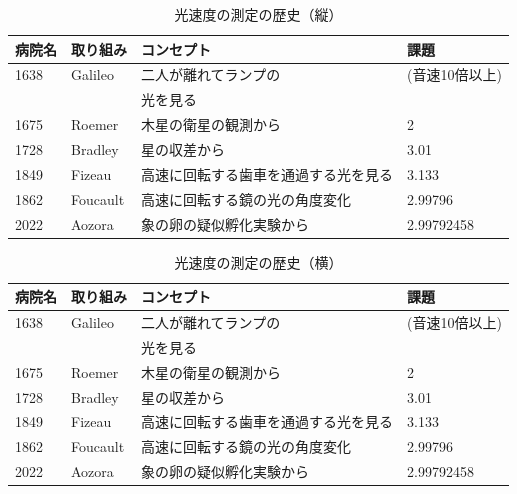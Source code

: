 \documentclass[11pt,a4paper]{ltjsreport}
\newcommand{\bhline}{\noalign{\hrule height 1.2pt}} %
\begin{document}
\begin{landscape}%
    \begin{table}[!ph]
        \caption{光速度の測定の歴史（縦）}
        \label{table:SpeedOfLightTate}
        \vspace{5mm}
        \centering
            \begin{tabular}{llll}
            \bhline
            病院名 & 取り組み & コンセプト & 課題 \\
            \hline
            1638 & Galileo & 二人が離れてランプの & (音速10倍以上) \\
             &  & 光を見る &  \\           
            1675 & Roemer & 木星の衛星の観測から & 2 \\
            1728 & Bradley & 星の収差から & 3.01 \\
            1849 & Fizeau & 高速に回転する歯車を通過する光を見る & 3.133 \\
            1862 & Foucault & 高速に回転する鏡の光の角度変化 & 2.99796 \\
            2022 & Aozora & 象の卵の疑似孵化実験から & 2.99792458 \\
            \hline
             \end{tabular}
    \end{table}
\end{landscape}

    \begin{table}[!ph]
        \caption{光速度の測定の歴史（横）}
        \label{table:SpeedOfLightYoko}
        \vspace{5mm}
        \centering
            \begin{tabular}{llll}
            \bhline
            病院名 & 取り組み & コンセプト & 課題 \\
            \hline
            1638 & Galileo & 二人が離れてランプの & (音速10倍以上) \\
             &  & 光を見る &  \\           
            1675 & Roemer & 木星の衛星の観測から & 2 \\
            1728 & Bradley & 星の収差から & 3.01 \\
            1849 & Fizeau & 高速に回転する歯車を通過する光を見る & 3.133 \\
            1862 & Foucault & 高速に回転する鏡の光の角度変化 & 2.99796 \\
            2022 & Aozora & 象の卵の疑似孵化実験から & 2.99792458 \\
            \hline
             \end{tabular}
    \end{table}
\end{document}
